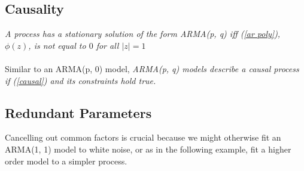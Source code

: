 \documentclass{article}
\begin{document}
\subsection{Causality}
\textit{A process has a stationary solution of the form ARMA(p, q) iff (\ref{ar poly}), $\phi(z)$, is not equal to $0$ for all $\lvert z \rvert = 1$}\\\\
Similar to an ARMA(p, 0) model, \textit{ARMA(p, q) models describe a causal process if (\ref{causal}) and its constraints hold true.}
\subsection{Redundant Parameters}
Cancelling out common factors is crucial because we might otherwise fit an ARMA(1, 1) model to white noise, or as in the following example, fit a higher order model to a simpler process.
\end{document}
